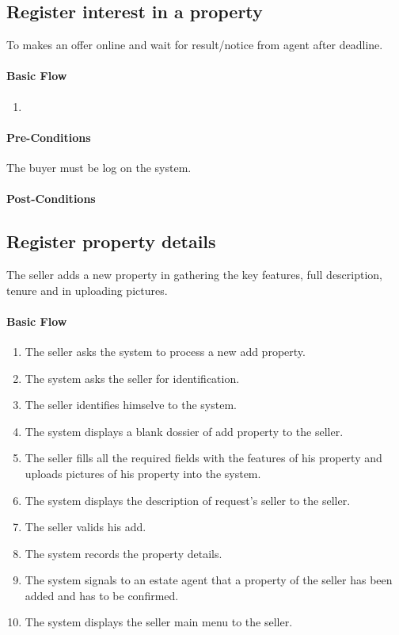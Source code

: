 \documentclass[a4paper,12pt]{article}
\begin{document}
\subsection{Register interest in a property}

To makes an offer online and wait for result/notice from agent after deadline.

\paragraph{Basic Flow}
\begin{enumerate}
\item
\end{enumerate}
\paragraph{Pre-Conditions}
The buyer must be log on the system.
\paragraph{Post-Conditions}

\subsection{Register property details}

The seller adds a new property in gathering the key features, full description, tenure and in uploading pictures.

\paragraph{Basic Flow}
\begin{enumerate}
\item The seller asks the system to process a new add property.
\item The system asks the seller for identification.
\item The seller identifies himselve to the system.
\item The system displays a blank dossier of add property to the seller.
\item The seller fills all the required fields with the features of his property and uploads pictures of his property into the system.
\item The system displays the description of request's seller to the seller.
\item The seller valids his add.
\item The system records the property details.
\item The system signals to an estate agent that a property of the seller has been added and has to be confirmed.
\item The system displays the seller main menu to the seller.
\end{enumerate}
\end{document}
